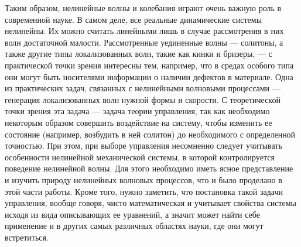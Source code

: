 

Таким образом, нелинейные волны и колебания играют очень важную роль в современной науке. В самом деле, все реальные динамические системы нелинейны. Их можно считать линейными лишь в случае рассмотрения в них волн достаточной малости. Рассмотренные уединенные волны — солитоны, а также другие типы локализованных волн, такие как кинки и бризеры, --- с практической точки зрения интересны тем, например, что в средах особого типа они могут быть носителями информации о наличии дефектов в материале. Одна из практических задач, связанных с нелинейными волновыми процессами --- генерация локализованных волн нужной формы и скорости. С теоретической точки зрения эта задача — задача теории управления, так как необходимо некоторым образом совершить воздействие на систему, чтобы изменить ее состояние (например, возбудить в ней солитон) до необходимого с определенной точностью. При этом, при выборе управления несомненно следует учитывать особенности нелинейной механической системы, в которой контролируется поведение нелинейной волны. Для этого необходимо иметь ясное представление и изучить природу нелинейных волновых процессов, что и было проделано в этой части работы. Кроме того, нужно заметить, что постановка такой задачи управления, вообще говоря, чисто математическая и учитывает свойства системы исходя из вида описывающих ее уравнений, а значит может найти себе применение и в других самых различных областях науки, где они могут встретиться.

